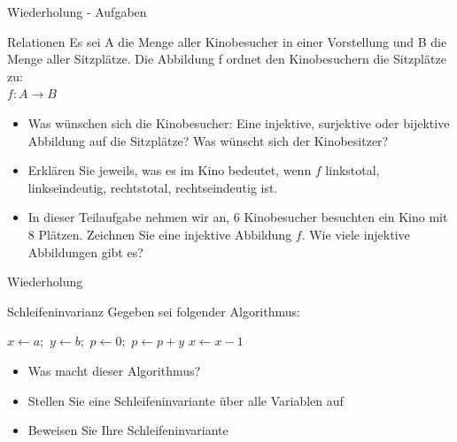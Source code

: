 	\begin{frame} {Wiederholung - Aufgaben}
		\begin{block}{Relationen}
			Es sei A die Menge aller Kinobesucher in einer Vorstellung 
			und B die Menge aller Sitzplätze. 
			Die Abbildung f ordnet den Kinobesuchern die Sitzplätze zu:\\
			\hspace{50pt}	$ f : A \rightarrow B $
			\begin{itemize}
				\pause
				\item Was wünschen sich die Kinobesucher: 
				Eine injektive, surjektive oder bijektive Abbildung 
				auf die Sitzplätze? Was wünscht sich der Kinobesitzer?
				
				\pause
				\item Erklären Sie jeweils, was es im Kino bedeutet, wenn $f$ linkstotal, linkseindeutig, rechtstotal, rechtseindeutig ist.
				
				\pause
				\item In dieser Teilaufgabe nehmen wir an, 6 Kinobesucher 
				besuchten ein Kino mit 8 Plätzen. 
				Zeichnen Sie eine injektive Abbildung $f$. 
				Wie viele injektive Abbildungen gibt es?
			\end{itemize}
		\end{block}
	\end{frame}
	
	
	
	\begin{frame} {Wiederholung}
		\begin{block}{Schleifeninvarianz}
			Gegeben sei folgender Algorithmus:\\
			\begin{algorithmic}
				\State $x \gets a;$
				\State $y \gets b;$
				\State $p \gets 0;$
					\State $p \gets p + y$
					\State $x \gets x - 1$
				\EndWhile
			\end{algorithmic}
			
			\begin{itemize}
				\pause
				\item Was macht dieser Algorithmus?
				
				\pause
				\item Stellen Sie eine Schleifeninvariante über alle 
				Variablen auf
				
				\pause
				\item Beweisen Sie Ihre Schleifeninvariante
			\end{itemize}						
		\end{block}
	\end{frame}
	
